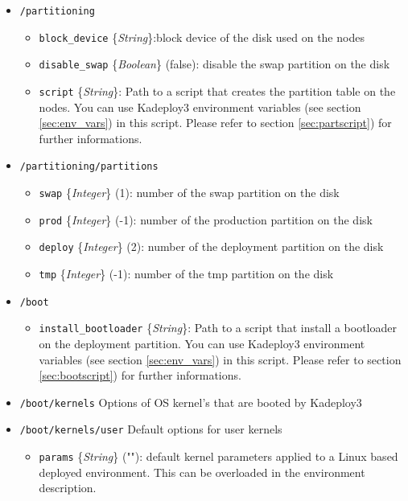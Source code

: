\documentclass[a4wide,10pt,oneside]{book}
\newcommand{\ypath}[1]{\texttt{#1}}
\newcommand{\yfield}[2]{\texttt{#1} {\small\{{\emph{#2}}\}}:}
\newcommand{\yfieldd}[3]{\texttt{#1} {\small\{{\emph{#2}}\}} {\small(}#3{\small)}:}
\begin{document}
\begin{itemize}
  \item \ypath{/partitioning}
  \begin{itemize}
    \item \yfield{block\_device}{String}block device of the disk used on the nodes
    \item \yfieldd{disable\_swap}{Boolean}{false} disable the swap partition on the disk
    \item \yfield{script}{String} Path to a script that creates the partition table on the nodes. You can use Kadeploy3 environment variables (see section \ref{sec:env_vars}) in this script. Please refer to section \ref{sec:partscript}) for further informations.
  \end{itemize}

  \item \ypath{/partitioning/partitions}
  \begin{itemize}
    \item \yfieldd{swap}{Integer}{1} number of the swap partition on the disk
    \item \yfieldd{prod}{Integer}{-1} number of the production partition on the disk
    \item \yfieldd{deploy}{Integer}{2} number of the deployment partition on the disk
    \item \yfieldd{tmp}{Integer}{-1} number of the tmp partition on the disk
  \end{itemize}

  \item \ypath{/boot}
  \begin{itemize}
    \item \yfield{install\_bootloader}{String} Path to a script that install a bootloader on the deployment partition. You can use Kadeploy3 environment variables (see section \ref{sec:env_vars}) in this script. Please refer to section \ref{sec:bootscript}) for further informations.
  \end{itemize}

  \item \ypath{/boot/kernels} Options of OS kernel's that are booted by Kadeploy3
  \item \ypath{/boot/kernels/user} Default options for user kernels
  \begin{itemize}
    \item \yfieldd{params}{String}{""} default kernel parameters applied to a Linux based deployed environment. This can be overloaded in the environment description.
  \end{itemize}


\end{itemize}
\end{document}
